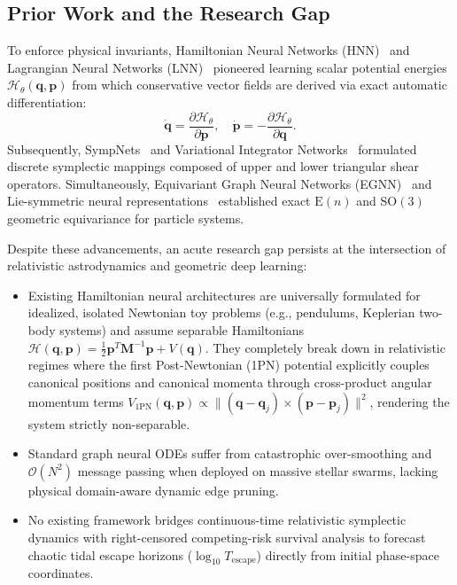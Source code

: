 \documentclass[preprint,12pt,3p]{elsarticle}
\begin{document}
\subsection{Prior Work and the Research Gap}
To enforce physical invariants, Hamiltonian Neural Networks (HNN)~\cite{greydanus2019hamiltonian} and Lagrangian Neural Networks (LNN)~\cite{cranmer2020lagrangian} pioneered learning scalar potential energies $\mathcal{H}_{\theta}(\bm{q}, \bm{p})$ from which conservative vector fields are derived via exact automatic differentiation:
\begin{equation}
\dot{\bm{q}} = \frac{\partial \mathcal{H}_{\theta}}{\partial \bm{p}}, \quad \dot{\bm{p}} = -\frac{\partial \mathcal{H}_{\theta}}{\partial \bm{q}}.
\end{equation}
Subsequently, SympNets~\cite{jin2020sympnets} and Variational Integrator Networks~\cite{saemundsson2020variational} formulated discrete symplectic mappings composed of upper and lower triangular shear operators. Simultaneously, Equivariant Graph Neural Networks (EGNN)~\cite{satorras2021egnn,batzner2022allegro} and Lie-symmetric neural representations~\cite{araujo2023equivariant} established exact $\mathrm{E}(n)$ and $\mathrm{SO}(3)$ geometric equivariance for particle systems.

Despite these advancements, an acute research gap persists at the intersection of relativistic astrodynamics and geometric deep learning:
\begin{itemize}
    \item Existing Hamiltonian neural architectures are universally formulated for idealized, isolated Newtonian toy problems (e.g., pendulums, Keplerian two-body systems) and assume separable Hamiltonians $\mathcal{H}(\bm{q}, \bm{p}) = \frac{1}{2}\bm{p}^T\bm{M}^{-1}\bm{p} + V(\bm{q})$. They completely break down in relativistic regimes where the first Post-Newtonian (1PN) potential explicitly couples canonical positions and canonical momenta through cross-product angular momentum terms $V_{1\mathrm{PN}}(\bm{q}, \bm{p}) \propto \|(\bm{q} - \bm{q}_j) \times (\bm{p} - \bm{p}_j)\|^2$, rendering the system strictly non-separable.
    \item Standard graph neural ODEs suffer from catastrophic over-smoothing and $\mathcal{O}(N^2)$ message passing when deployed on massive stellar swarms, lacking physical domain-aware dynamic edge pruning.
    \item No existing framework bridges continuous-time relativistic symplectic dynamics with right-censored competing-risk survival analysis to forecast chaotic tidal escape horizons ($\log_{10} T_{\mathrm{escape}}$) directly from initial phase-space coordinates.
\end{itemize}
\end{document}
